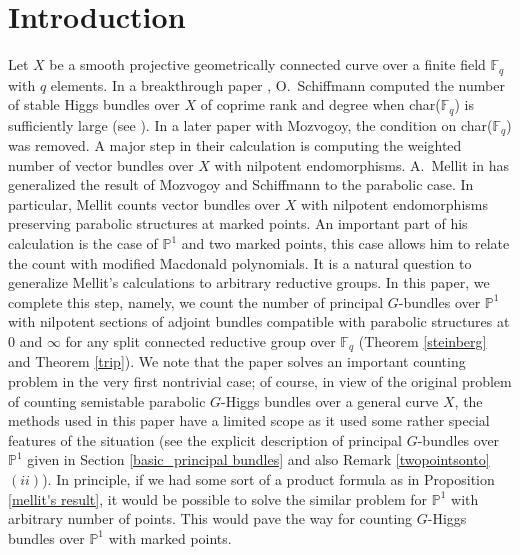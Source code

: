 \documentclass{amsart}
\theoremstyle{plain}
\theoremstyle{definition}
\theoremstyle{remark}
\begin{document}
\section{Introduction}
Let $X$ be a smooth projective geometrically connected curve over a finite field $\mathbb{F}_{q}$ with $q$ elements. In a breakthrough paper \cite{Sch}, O.~Schiffmann computed the number of stable Higgs bundles over $X$ of coprime rank and degree when char($\mathbb{F}_{q}$) is sufficiently large (see \cite[Theorem 1.2]{Sch}). In a later paper \cite{MS20} with Mozvogoy, the condition on char($\mathbb{F}_{q}$) was removed. A major step in their calculation is computing the weighted number of vector bundles over $X$ with nilpotent endomorphisms.
A.~Mellit in \cite{Mel} has generalized the result of Mozvogoy and Schiffmann to the parabolic case. In particular, Mellit 
 counts vector bundles over $X$ with nilpotent endomorphisms preserving parabolic structures at marked points. An important part of his calculation is the case of $\mathbb{P}^{1}$ and two marked points, this case allows him to relate the count with modified Macdonald polynomials. It is a natural question to generalize Mellit's calculations to arbitrary reductive groups. In this paper, we complete this step, namely, we count the number of principal $G$-bundles over $\mathbb{P}^1$ with nilpotent sections of adjoint bundles compatible with parabolic structures at $0$ and $\infty$ for any split connected reductive group over $\mathbb{F}_{q}$ (Theorem \ref{steinberg} and Theorem \ref{trip}). We note that the paper solves 
 an important counting problem in the very
first nontrivial case; of course, in view of the original problem of counting semistable parabolic $G$-Higgs bundles over a general curve $X$, the methods used in this paper have a limited scope as it used some rather special features of the
situation (see the explicit description of principal $G$-bundles over $\mathbb{P}^1$ given in Section \ref{basic_principal bundles} and also Remark \ref{twopointsonto}$(ii)$). In principle, if we had some sort of
a product formula as in Proposition \ref{mellit's result}, it would be possible to solve the similar problem
for $\mathbb{P}^1$ with arbitrary number of points. This would pave the way for counting $G$-Higgs
bundles over $\mathbb{P}^1$ with marked points.
\end{document}
